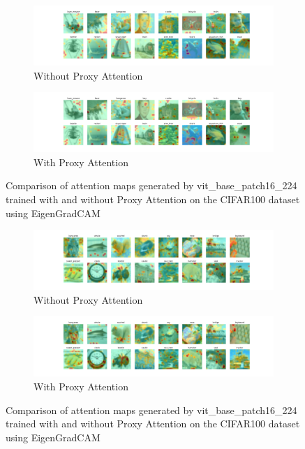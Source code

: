 \documentclass[a4paper,11pt,openright]{book}
\begin{document}
\begin{figure}[!htb]
    \centering
    \begin{subfigure}[b]{1\textwidth}
        \includegraphics[width=\textwidth]{images/gpp_cifar100_vit_base_patch16_224_noproxy_1.pdf}
        \caption{Without Proxy Attention}
    \end{subfigure}
    \hfill
    \begin{subfigure}[b]{1\textwidth}
        \includegraphics[width=\textwidth]{images/gpp_cifar100_vit_base_patch16_224_proxy_1.pdf}
        \caption{With Proxy Attention}
    \end{subfigure}
    \caption{Comparison of attention maps generated by vit\_base\_patch16\_224 trained with and without Proxy Attention on the CIFAR100 dataset using EigenGradCAM}
\end{figure}


\begin{figure}[!htb]
    \centering
    \begin{subfigure}[b]{1\textwidth}
        \includegraphics[width=\textwidth]{images/gpp_cifar100_vit_base_patch16_224_noproxy_2.pdf}
        \caption{Without Proxy Attention}
    \end{subfigure}
    \hfill
    \begin{subfigure}[b]{1\textwidth}
        \includegraphics[width=\textwidth]{images/gpp_cifar100_vit_base_patch16_224_proxy_2.pdf}
        \caption{With Proxy Attention}
    \end{subfigure}
    \caption{Comparison of attention maps generated by vit\_base\_patch16\_224 trained with and without Proxy Attention on the CIFAR100 dataset using EigenGradCAM}
\end{figure}
\end{document}
